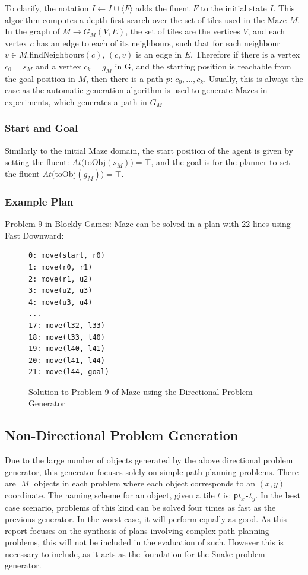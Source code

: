 \noindent To clarify, the notation $I \gets I \cup \langle F \rangle$ adds the fluent $F$ to the initial state $I$. This algorithm computes a depth first search \cite{depthfirstsearch} over the set of tiles used in the Maze $M$. In the graph of $M \rightarrow G_M(V, E)$, the set of tiles are the vertices $V$, and each vertex $c$ has an edge to each of its neighbours, such that for each neighbour $v \in M$.findNeighbours$(c)$, $(c, v)$ is an edge in $E$. Therefore if there is a vertex $c_0 = s_M$ and a vertex $c_k = g_M$ in G, and the starting position is reachable from the goal position in $M$, then there is a path $p$: $c_0, ..., c_k$. Usually, this is always the case as the automatic generation algorithm is used to generate Mazes in experiments, which generates a path in $G_M$

\subsubsection{Start and Goal}
Similarly to the initial Maze domain, the start position of the agent is given by setting the fluent: $At($toObj$(s_M)) = \top$, and the goal is for the planner to set the fluent $At($toObj$(g_M)) = \top$.

\newpage
\subsubsection{Example Plan}
Problem 9 in Blockly Games: Maze can be solved in a plan with 22 lines using Fast Downward:\\
\begin{figure}[h!]
\centering
\begin{BVerbatim}
0: move(start, r0)
1: move(r0, r1)
2: move(r1, u2)
3: move(u2, u3)
4: move(u3, u4)
...
17: move(l32, l33)
18: move(l33, l40)
19: move(l40, l41)
20: move(l41, l44)
21: move(l44, goal)
\end{BVerbatim}
\caption{Solution to Problem 9 of Maze using the Directional Problem Generator}
\end{figure}

\subsection{Non-Directional Problem Generation}
Due to the large number of objects generated by the above directional problem generator, this generator focuses solely on simple path planning problems. There are $|M|$ objects in each problem where each object corresponds to an $(x, y)$ coordinate. The naming scheme for an object, given a tile $t$ is: \texttt{p}$t_x$\texttt{-}$t_y$. In the best case scenario, problems of this kind can be solved four times as fast as the previous generator. In the worst case, it will perform equally as good. As this report focuses on the synthesis of plans involving complex path planning problems, this will not be included in the evaluation of such. However this is necessary to include, as it acts as the foundation for the Snake problem generator.


